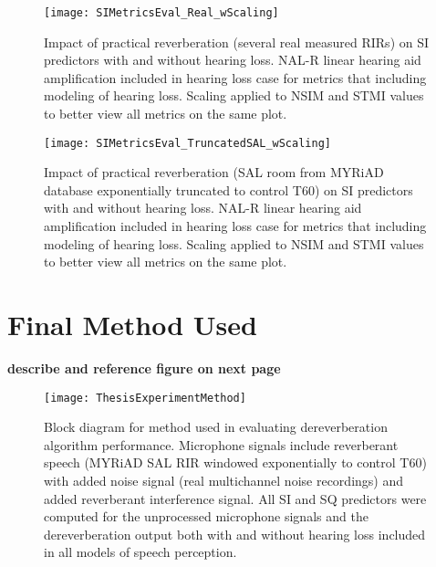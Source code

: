 \begin{figure}[H]
	\texttt{[image: SIMetricsEval\_Real\_wScaling]}
	\centering
	\caption{Impact of practical reverberation (several real measured RIRs) on SI predictors with and without hearing loss. NAL-R linear hearing aid amplification included in hearing loss case for metrics that including modeling of hearing loss.  Scaling applied to NSIM and STMI values to better view all metrics on the same plot.}
	\label{fig:SIMetricsEval_Real_wScaling}
\end{figure}

\begin{figure}[H]
	\texttt{[image: SIMetricsEval\_TruncatedSAL\_wScaling]}
	\centering
	\caption{Impact of practical reverberation (SAL room from MYRiAD database exponentially truncated to control T60) on SI predictors with and without hearing loss. NAL-R linear hearing aid amplification included in hearing loss case for metrics that including modeling of hearing loss.  Scaling applied to NSIM and STMI values to better view all metrics on the same plot.}
	\label{fig:SIMetricsEval_TruncatedSAL_wScaling}
\end{figure}



\section{Final Method Used}

\textbf{describe and reference figure on next page}


\newpage
\vfill

\begin{sidewaysfigure}
	\texttt{[image: ThesisExperimentMethod]}%
	\label{fig:Evaluation_Block_Diagram}
	\caption{Block diagram for method used in evaluating dereverberation algorithm performance. Microphone signals include reverberant speech (MYRiAD SAL RIR windowed exponentially to control T60) with added noise signal (real multichannel noise recordings) and added reverberant interference signal. All SI and SQ predictors were computed for the unprocessed microphone signals and the dereverberation output both with and without hearing loss included in all models of speech perception.}
\end{sidewaysfigure}

